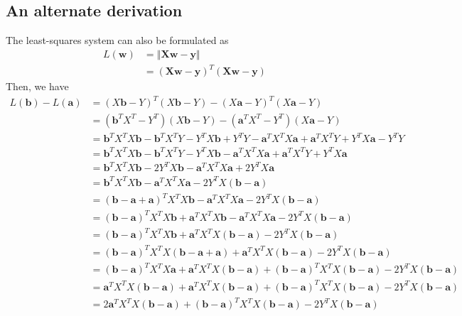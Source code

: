 \documentclass{article}
\begin{document}
\subsection{An alternate derivation}
The least-squares system can also be formulated as 
\[
    \begin{aligned} L(\textbf{w}) &= \left\Vert \textbf{X}\textbf{w} - \textbf{y} \right\Vert \\ &= (\textbf{X}\textbf{w} - \textbf{y})^T (\textbf{X}\textbf{w} - \textbf{y}) \end{aligned}
\]
Then, we have
\[
    \begin{aligned}
			L(\textbf{b}) - L(\textbf{a}) &= (X\textbf{b} - Y)^T (X\textbf{b} - Y) - (X\textbf{a} - Y)^T (X\textbf{a} - Y) \\
			&= (\textbf{b}^T X^T - Y^T)(X\textbf{b} - Y) - (\textbf{a}^T X^T - Y^T)(X\textbf{a} - Y) \\
			&= \textbf{b}^T X^T X \textbf{b} - \textbf{b}^T X^T Y - Y^T X\textbf{b} + Y^T Y - \textbf{a}^T X^T X\textbf{a} + \textbf{a}^T X^T Y + Y^T X\textbf{a} - Y^T Y \\
			&= \textbf{b}^T X^T X \textbf{b} - \textbf{b}^T X^T Y - Y^T X\textbf{b} - \textbf{a}^T X^T X\textbf{a} + \textbf{a}^T X^T Y + Y^T X\textbf{a} \\
			&= \textbf{b}^T X^T X \textbf{b} - 2Y^T X\textbf{b} - \textbf{a}^T X^T X\textbf{a} + 2Y^T X\textbf{a} \\
			&= \textbf{b}^T X^T X \textbf{b} - \textbf{a}^T X^T X\textbf{a} - 2Y^T X(\textbf{b} - \textbf{a}) \\
			&= (\textbf{b} - \textbf{a} + \textbf{a})^T X^T X \textbf{b} - \textbf{a}^T X^T X\textbf{a} - 2Y^T X(\textbf{b} - \textbf{a}) \\
			&= (\textbf{b} - \textbf{a})^T X^T X \textbf{b} + \textbf{a}^T X^T X \textbf{b} - \textbf{a}^T X^T X\textbf{a} - 2Y^T X(\textbf{b} - \textbf{a}) \\
			&= (\textbf{b} - \textbf{a})^T X^T X \textbf{b} + \textbf{a}^T X^T X (\textbf{b} - \textbf{a}) - 2Y^T X(\textbf{b} - \textbf{a}) \\
			&= (\textbf{b} - \textbf{a})^T X^T X (\textbf{b} - \textbf{a} + \textbf{a}) + \textbf{a}^T X^T X (\textbf{b} - \textbf{a}) - 2Y^T X(\textbf{b} - \textbf{a}) \\
			&= (\textbf{b} - \textbf{a})^T X^T X\textbf{a} + \textbf{a}^T X^T X(\textbf{b} - \textbf{a}) + (\textbf{b} - \textbf{a})^T X^T X(\textbf{b} - \textbf{a}) - 2Y^T X(\textbf{b} - \textbf{a}) \\
			&= \textbf{a}^T X^T X (\textbf{b} - \textbf{a}) + \textbf{a}^T X^T X(\textbf{b} - \textbf{a}) + (\textbf{b} - \textbf{a})^T X^T X(\textbf{b} - \textbf{a}) - 2Y^T X(\textbf{b} - \textbf{a}) \\
			&= 2\textbf{a}^T X^T X(\textbf{b} - \textbf{a}) + (\textbf{b} - \textbf{a})^T X^T X(\textbf{b} - \textbf{a}) - 2Y^T X(\textbf{b} - \textbf{a})
		\end{aligned}
\]
\end{document}
